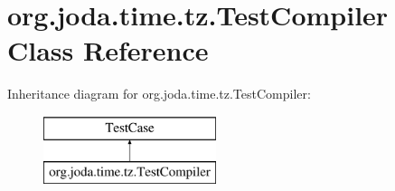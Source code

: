\hypertarget{classorg_1_1joda_1_1time_1_1tz_1_1_test_compiler}{\section{org.\-joda.\-time.\-tz.\-Test\-Compiler Class Reference}
\label{classorg_1_1joda_1_1time_1_1tz_1_1_test_compiler}
}
Inheritance diagram for org.\-joda.\-time.\-tz.\-Test\-Compiler\-:\begin{figure}[H]
\begin{center}
\leavevmode
\includegraphics[height=2.000000cm]{classorg_1_1joda_1_1time_1_1tz_1_1_test_compiler}
\end{center}
\end{figure}
